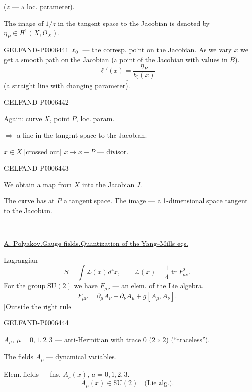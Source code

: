 (\(z\) --- a loc. parameter).

The image of \(1/z\) in the tangent space to the Jacobian is denoted by \(\eta_P\in H^1(X,O_X)\).


\begin{GelfandAdjacentEvidence}{GELFAND-P000644}{1}
\(\ell_0\) --- the corresp. point on the Jacobian. As we vary \(x\) we get a smooth path on the Jacobian
(a point of the Jacobian with values in \(B\)).
\[
\underline{\ell'(x)=\frac{\eta_P}{b_0(x)}}
\]
(a straight line with changing parameter).
\end{GelfandAdjacentEvidence}
\begin{GelfandAdjacentEvidence}{GELFAND-P000644}{2}


\underline{Again:} curve \(X\), point \(P\), loc. param..

\(\Rightarrow\) a line in the tangent space to the Jacobian.

\(x\in\overline X\) [crossed out] \(x\mapsto\overline{x-P}\) --- \underline{divisor}.
\end{GelfandAdjacentEvidence}
\begin{GelfandAdjacentEvidence}{GELFAND-P000644}{3}


We obtain a map from \(\overline X\) into the Jacobian \(J\).

The curve has at \(P\) a tangent space.
The image --- a 1-dimensional space tangent to the Jacobian.

\begin{center}\textemdash\,\textperiodcentered\,\textemdash\end{center}

\underline{A. Polyakov.}\quad\underline{Gauge fields.}\quad\underline{Quantization of the Yang–Mills eqs.}

Lagrangian
\[
S=\int\mathcal L(x)d^4x,\qquad \mathcal L(x)=\frac14\operatorname{tr} F_{\mu\nu}^2.
\]
For the group \(\mathrm{SU}(2)\) we have \(F_{\mu\nu}\) --- an elem. of the Lie algebra.
\[
F_{\mu\nu}=\partial_\mu A_\nu-\partial_\nu A_\mu+g[A_\mu,A_\nu].
\]
[Outside the right rule]
\end{GelfandAdjacentEvidence}
\begin{GelfandAdjacentEvidence}{GELFAND-P000644}{4}


\(A_\mu\), \(\mu=0,1,2,3\) --- anti-Hermitian with trace \(0\) (\(2\times2\)) (“traceless”).

The fields \(A_\mu\) --- dynamical variables.

Elem. fields --- fns. \(A_\mu(x)\), \(\mu=0,1,2,3\).
\[
A_\mu(x)\in\mathrm{SU}(2)\quad\text{(Lie alg.)}.
\]
\end{GelfandAdjacentEvidence}
